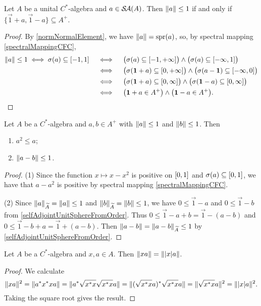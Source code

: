 \begin{lemma} \label{selfAdjointUnitSphereFromOrder}
Let $A$ be a unital $C^*$-algebra and $a\in \mathop{\mathcal{S}\hspace{-0.15em}\mathcal{A}}\nolimits(A)$. Then $\lVert a\rVert \leq 1$ \textup{if and only if} $\{\vec{1}+a, \vec{1}- a\} \subseteq A^+$. 
\end{lemma}
\begin{proof}
By \ref{normNormalElement}, we have $\lVert a\rVert = \operatorname{spr}(a)$, so, by spectral mapping \ref{spectralMappingCFC},
\begin{align*}
\norm{a}\leq 1 \iff \spec(a) \subseteq \interval{-1,1} \quad&\iff\quad \big(\spec(a) \subseteq \interval{-1,+\infty}\big) \land \big(\spec(a) \subseteq \interval{-\infty,1}\big) \\
&\iff \quad \big(\spec(\vec{1} + a) \subseteq \interval{0,+\infty}\big) \land \big(\spec(a - \vec{1}) \subseteq \interval{-\infty,0}\big) \\
&\iff \quad \big(\spec(\vec{1} + a) \subseteq \interval{0,\infty}\big) \land \big(\spec(\vec{1}-a) \subseteq \interval{0, \infty}\big) \\
&\iff \quad \big(\vec{1} + a\in A^+\big) \land \big(\vec{1}-a\in A^+\big).
\end{align*}
\end{proof}

\begin{lemma} \label{orderSubUnitVectorLemma}
Let $A$ be a $C^*$-algebra and $a, b\in A^+$ with $\lVert a\rVert\leq 1$ and $\lVert b\rVert\leq 1$. Then
\begin{enumerate}
\item $a^2 \leq a$;
\item $\lVert a-b\rVert \leq 1$.
\end{enumerate}
\end{lemma}
\begin{proof}
(1) Since the function $x\mapsto x-x^2$ is positive on $\interval{0,1}$ and $\spec(a) \subseteq \interval{0,1}$, we have that $a - a^2$ is positive by spectral mapping \ref{spectralMappingCFC}.

(2) Since $\lVert a\rVert_{\widetilde{A}} = \lVert a\rVert \leq 1$ and $\lVert b\rVert_{\widetilde{A}} = \lVert b\rVert \leq 1$, we have $0\leq \vec{1}-a$ and $0\leq \vec{1}-b$ from \ref{selfAdjointUnitSphereFromOrder}. Thus $0\leq \vec{1}-a+b = \vec{1} - (a-b)$ and $0\leq \vec{1} -b +a = \vec{1}+ (a-b)$. Then $\lVert a-b\rVert = \lVert a-b\rVert_{\widetilde{A}} \leq 1$ by \ref{selfAdjointUnitSphereFromOrder}.
\end{proof}

\begin{lemma} \label{firstFactorInNormToAbsValue}
Let $A$ be a $C^*$-algebra and $x,a\in A$. Then $\lVert xa\rVert = \lVert|x|a\rVert$.
\end{lemma}
\begin{proof}
We calculate
\[ \lVert xa\rVert^2 = \lVert a^*x^*xa\rVert = \lVert a^*\sqrt{x^*x}\sqrt{x^*x}a\rVert = \lVert(\sqrt{x^*x}a)^*\sqrt{x^*x}a\rVert = \lVert\sqrt{x^*x}a\rVert^2 = \lVert|x|a\rVert^2. \]
Taking the square root gives the result.
\end{proof}

